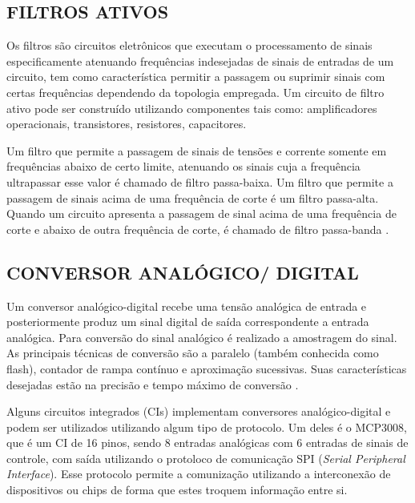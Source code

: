 \documentclass[12pt, a4paper]{article}
\begin{document}
\subsection{FILTROS ATIVOS}
\hspace*{0.8cm}Os filtros são circuitos eletrônicos que executam o processamento de sinais especificamente atenuando frequências indesejadas de sinais de entradas de um circuito, tem como característica permitir a passagem ou suprimir sinais com certas frequências dependendo da topologia empregada. Um circuito de filtro ativo pode ser construído utilizando componentes tais como: amplificadores operacionais, transistores, resistores, capacitores.

Um filtro que permite a passagem de sinais de tensões e corrente somente em frequências abaixo de certo limite, atenuando os sinais cuja a frequência ultrapassar esse valor é chamado de filtro passa-baixa. Um filtro que permite a passagem de sinais acima de uma frequência de corte é um filtro passa-alta. Quando um circuito apresenta a passagem de sinal acima de uma frequência de corte e abaixo de outra frequência de corte, é chamado de filtro passa-banda \cite{boy}.

\subsection{CONVERSOR ANALÓGICO/ DIGITAL}

\hspace*{0.8cm}Um conversor analógico-digital recebe uma tensão analógica de entrada e posteriormente produz um sinal digital de saída correspondente a entrada analógica. Para conversão do sinal analógico é realizado a amostragem do sinal. As principais técnicas de conversão são a paralelo (também conhecida como flash), contador de rampa contínuo e aproximação sucessivas. Suas características desejadas estão na precisão e tempo máximo de conversão \cite{digi}.

Alguns circuitos integrados (CIs) implementam conversores analógico-digital e podem ser utilizados utilizando algum tipo de protocolo. Um deles é o MCP3008, que é um CI de 16 pinos, sendo 8 entradas analógicas com 6 entradas de sinais de controle, com saída utilizando o protoloco  de comunicação SPI (\textit{Serial Peripheral Interface}). Esse protocolo permite a comunização utilizando a interconexão de dispositivos ou chips de forma que estes troquem informação entre si.
\end{document}
